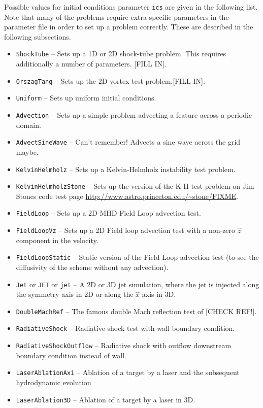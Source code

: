 \documentclass[a4paper,11pt]{report}
\begin{document}
Possible values for initial conditions parameter \verb|ics| are given in the following list.  Note that many of the problems require extra specific parameters in the parameter file in order to set up a problem correctly.  These are described in the following subsections.
\begin{itemize}
  \item \verb|ShockTube| -- Sets up a 1D or 2D shock-tube problem.
  This requires additionally a number of parameters. [FILL IN].
  \item \verb|OrszagTang| -- Sets up the 2D \citet{OrsTan79} vortex test problem.[FILL IN].
  \item \verb|Uniform| -- Sets up uniform initial conditions.
  \item \verb|Advection| -- Sets up a simple problem advecting a feature across a periodic domain.
  \item \verb|AdvectSineWave| -- Can't remember! Advects a sine wave across the grid maybe.
  \item \verb|KelvinHelmholz| -- Sets up a Kelvin-Helmholz instability test problem.
  \item \verb|KelvinHelmholzStone| -- Sets up the version of the K-H test problem on Jim Stones code test page \url{http://www.astro.princeton.edu/~stone/FIXME}.
  \item \verb|FieldLoop| -- Sets up a 2D MHD Field Loop advection test.
  \item \verb|FieldLoopVz| -- Sets up a 2D Field loop advection test with a non-zero $\hat{z}$ component in the velocity.
  \item \verb|FieldLoopStatic| -- Static version of the Field Loop advection test (to see the diffusivity of the scheme without any advection).
  \item \verb|Jet| or \verb|JET| or \verb|jet| -- A 2D or 3D jet simulation, where the jet is injected along the symmetry axis in 2D or along the $\hat{x}$ axis in 3D.
  \item \verb|DoubleMachRef| -- The famous double Mach reflection test of \citet{ColWoo84} [CHECK REF!].
  \item \verb|RadiativeShock| -- Radiative shock test \citep[e.g.][]{InnGidFal87} with wall boundary condition.
  \item \verb|RadiativeShockOutflow| -- Radiative shock with outflow downstream boundary condition instead of wall.
  \item \verb|LaserAblationAxi| -- Ablation of a target by a laser and the subsequent hydrodynamic evolution
  \item \verb|LaserAblation3D| -- Ablation of a target by a laser in 3D.

\end{itemize}
\end{document}
